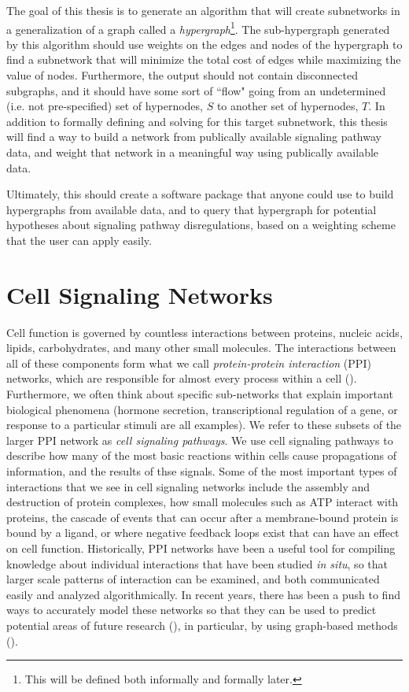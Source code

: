 \documentclass[12pt,twoside]{reedthesis}
\theoremstyle{definition}
\begin{document}
 The goal of this thesis is to generate an algorithm that will create subnetworks in a generalization of a graph called a \textit{hypergraph}\footnote{This will be defined both informally and formally later.}. The sub-hypergraph generated by this algorithm should use weights on the edges and nodes of the hypergraph to find a subnetwork that will minimize the total cost of edges while maximizing the value of nodes. Furthermore, the output should not contain disconnected subgraphs, and it should have some sort of ``flow" going from an undetermined (i.e. not pre-specified) set of hypernodes, $S$ to another set of hypernodes, $T$. In addition to formally defining and solving for this target subnetwork, this thesis will find a way to build a network from publically available signaling pathway data, and weight that network in a meaningful way using publically available data.\par

 Ultimately, this should create a software package that anyone could use to build hypergraphs from available data, and to query that hypergraph for potential hypotheses about signaling pathway disregulations, based on a weighting scheme that the user can apply easily.\par

\chapter{Cell Signaling Networks}

Cell function is governed by countless interactions between proteins, nucleic acids, lipids, carbohydrates, and many other small molecules.  The interactions between all of these components form what we call \textit{protein-protein interaction} (PPI) networks, which are responsible for almost every process within a cell (\cite{thing}). Furthermore, we often think about specific sub-networks that explain important biological phenomena (hormone secretion, transcriptional regulation of a gene, or response to a particular stimuli are all examples). We refer to these subsets of the larger PPI network as \textit{cell signaling pathways}. We use cell signaling pathways to describe how many of the most basic reactions within cells cause propagations of information, and the results of thse signals.  Some of the most important types of interactions that we see in cell signaling networks include the assembly and destruction of protein complexes, how small molecules such as ATP interact with proteins, the cascade of events that can occur after a membrane-bound protein is bound by a ligand, or where negative feedback loops exist that can have an effect on cell function.  Historically, PPI networks have been a useful tool for compiling knowledge about individual interactions that have been studied \textit{in situ}, so that larger scale patterns of interaction can be examined, and both communicated easily and analyzed algorithmically. In recent years, there has been a push to find ways to accurately model these networks so that they can be used to predict potential areas of future research (\cite{papers}), in particular, by using graph-based methods (\cite{Aittokallio2006}).\par
\end{document}
